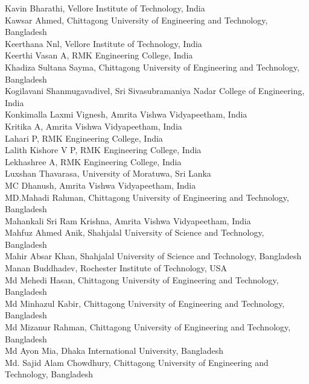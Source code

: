 \documentclass[11pt,oneside]{book}
\begin{document}
\begin{description}
          Kavin Bharathi, Vellore Institute of Technology, India\\
          Kawsar Ahmed, Chittagong University of Engineering and Technology, Bangladesh\\
          Keerthana Nnl, Vellore Institute of Technology, India\\
          Keerthi Vasan A, RMK Engineering College, India\\
          Khadiza Sultana Sayma, Chittagong University of Engineering and Technology, Bangladesh\\
          Kogilavani Shanmugavadivel, Sri Sivasubramaniya Nadar College of Engineering, India\\
          Konkimalla Laxmi Vignesh, Amrita Vishwa Vidyapeetham, India\\
          Kritika A, Amrita Vishwa Vidyapeetham, India\\
          Lahari P, RMK Engineering College, India\\
          Lalith Kishore V P, RMK Engineering College, India\\
          Lekhashree A, RMK Engineering College, India\\
          Luxshan Thavarasa, University of Moratuwa, Sri Lanka\\
          MC Dhanush, Amrita Vishwa Vidyapeetham, India\\
          MD.Mahadi Rahman, Chittagong University of Engineering and Technology, Bangladesh\\
          Mahankali Sri Ram Krishna, Amrita Vishwa Vidyapeetham, India\\
          Mahfuz Ahmed Anik, Shahjalal University of Science and Technology, Bangladesh\\
          Mahir Absar Khan, Shahjalal University of Science and Technology, Bangladesh\\
          Manan Buddhadev, Rochester Institute of Technology, USA\\
          Md Mehedi Hasan, Chittagong University of Engineering and Technology, Bangladesh\\
          Md Minhazul Kabir, Chittagong University of Engineering and Technology, Bangladesh\\
          Md Mizanur Rahman, Chittagong University of Engineering and Technology, Bangladesh\\
          Md Ayon Mia, Dhaka International University, Bangladesh\\
          Md. Sajid Alam Chowdhury, Chittagong University of Engineering and Technology, Bangladesh\\

\end{description}
\end{document}

